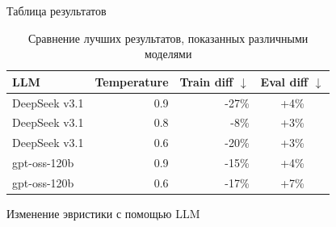 \documentclass[final]{beamer}
\newlength{\colwidth}
\begin{document}
\begin{frame}[t]
\begin{columns}[t]
\begin{column}{\colwidth}
  \begin{block}{Таблица результатов}
    \begin{table}
      \centering
      \begin{tabular}{l r r c}
        \toprule
        \textbf{LLM} & \textbf{Temperature} & \textbf{Train diff} $\downarrow$ & \textbf{Eval diff} $\downarrow$ \\
        \midrule
        DeepSeek v3.1 & 0.9 &  -27\% & +4\%\\
        DeepSeek v3.1 & 0.8 & -8\% & +3\% \\
        DeepSeek v3.1 & 0.6 & -20\% & +3\% \\
        gpt-oss-120b & 0.9 & -15\%& +4\%\\
        gpt-oss-120b & 0.6 & -17\% & +7\%\\
        \bottomrule
      \end{tabular}
      \caption{Сравнение лучших результатов, показанных различными моделями}
    \end{table}
  \end{block}

\begin{block}{Изменение эвристики с помощью LLM}
\vspace{0.5em}


\end{block}
\end{column}
\end{columns}
\end{frame}
\end{document}

